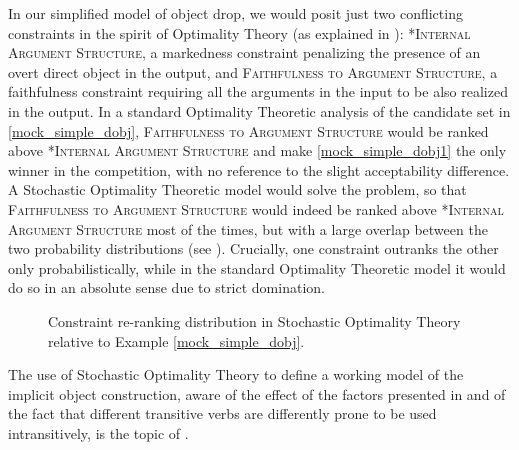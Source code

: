 In our simplified model of object drop, we would posit just two conflicting constraints in the spirit of Optimality Theory (as explained in ): \textsc{*Internal Argument Structure}, a markedness constraint penalizing the presence of an overt direct object in the output, and \textsc{Faithfulness to Argument Structure}, a faithfulness constraint requiring all the arguments in the input to be also realized in the output. In a standard Optimality Theoretic analysis of the candidate set in \ref{mock_simple_dobj}, \textsc{Faithfulness to Argument Structure} would be ranked above \textsc{*Internal Argument Structure} and make \ref{mock_simple_dobj1} the only winner in the competition, with no reference to the slight acceptability difference. A Stochastic Optimality Theoretic model would solve the problem, so that \textsc{Faithfulness to Argument Structure} would indeed be ranked above \textsc{*Internal Argument Structure} most of the times, but with a large overlap between the two probability distributions (see ). Crucially, one constraint outranks the other only probabilistically, while in the standard Optimality Theoretic model it would do so in an absolute sense due to strict domination.

\begin{figure}[htb]
\caption{Constraint re-ranking distribution in Stochastic Optimality Theory relative to Example \ref{mock_simple_dobj}.}
\end{figure}

The use of Stochastic Optimality Theory to define a working model of the implicit object construction, aware of the effect of the factors presented in  and of the fact that different transitive verbs are differently prone to be used intransitively, is the topic of .